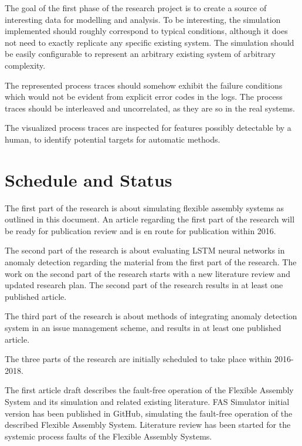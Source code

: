 \documentclass[a4paper,12pt]{article}
\begin{document}
The goal of the first phase of the research project is to create a source of interesting data for modelling and analysis.
To be interesting, the simulation implemented should roughly correspond to typical
conditions, although it does not need to exactly replicate any specific existing system. The simulation should be easily configurable to represent an arbitrary existing system
of arbitrary complexity.

The represented process traces should somehow exhibit the failure conditions
which would not be evident from explicit error codes in the logs. The process traces should be interleaved and uncorrelated, as they are so in the real systems.

The visualized process traces are inspected for features possibly detectable by a human, to identify potential targets for automatic methods.

\section{Schedule and Status}

The first part of the research is about simulating flexible assembly systems as outlined in this document.
An article regarding the first part of the research will be ready for publication review and is en route for publication within 2016.

The second part of the research is about evaluating LSTM neural networks in anomaly detection regarding the material from the first part of the research.
The work on the second part of the research starts with a new literature review and updated research plan. The second part of the research results in at least one published article.

The third part of the research is about methods of integrating anomaly detection system in an issue management scheme, and results in at least one published article.

The three parts of the research are initially scheduled to take place within 2016-2018.\cite{kuha}

The first article draft describes the fault-free operation of the Flexible Assembly System and its simulation and related existing literature.
FAS Simulator initial version has been published in GitHub, simulating the fault-free operation of the described Flexible Assembly System.
Literature review has been started for the systemic process faults of the Flexible Assembly Systems.

\newpage


\end{document}
